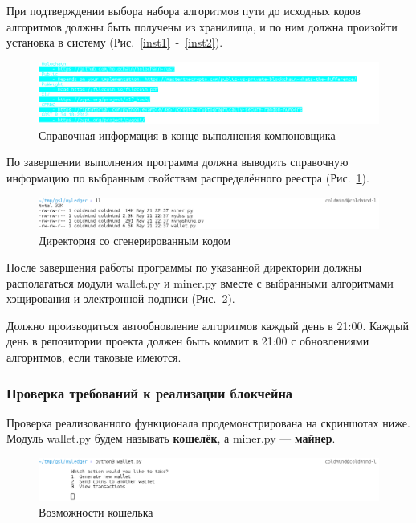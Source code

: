 При подтверждении выбора набора алгоритмов пути до исходных кодов алгоритмов
должны быть получены из хранилища, и по ним должна произойти установка в
систему (Рис.~\ref{inst1}~-~\ref{inst2}).

\begin{figure}[h!]
    \centering
    \includegraphics[width=\textwidth]{./screenshots/spravka}
    \caption{Справочная информация в конце выполнения компоновщика}\label{spravka}
\end{figure}

По завершении выполнения программа должна выводить справочную информацию по
выбранным свойствам распределённого реестра (Рис.~\ref{spravka}).

\begin{figure}[h!]
    \centering
    \includegraphics[width=\textwidth]{./screenshots/lldir}
    \caption{Директория со сгенерированным кодом}\label{lldir}
\end{figure}

После завершения работы программы по указанной директории должны располагаться
модули {\small wallet.py} и {\small miner.py} вместе с выбранными алгоритмами
хэщирования и электронной подписи (Рис.~\ref{lldir}).

Должно производиться автообновление алгоритмов каждый день в 21:00. Каждый день
в репозитории проекта должен быть коммит в 21:00 с обновлениями алгоритмов,
если таковые имеются.


\subsubsection{Проверка требований к реализации блокчейна}
Проверка реализованного функционала продемонстрирована на скриншотах ниже.
Модуль {\small wallet.py} будем называть \textbf{кошелёк}, а {\small miner.py}
--- \textbf{майнер}.

\begin{figure}[h!]
    \centering
    \includegraphics[width=\textwidth]{./screenshots/wallet_options}
    \caption{Возможности кошелька}\label{wallet}
\end{figure}

